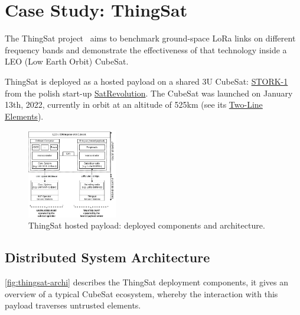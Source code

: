 \section{Case Study: ThingSat}
\label{sec:case-study}

The ThingSat project~\cite{git:thingsat-repo} aims to benchmark ground-space
LoRa links on different frequency bands and demonstrate the
effectiveness of that technology inside a LEO (Low Earth Orbit) CubeSat.

ThingSat is deployed as a hosted payload on a shared 3U CubeSat:
\href{https://space.skyrocket.de/doc_sdat/stork-1.htm}{STORK-1} from the polish
start-up \href{https://www.satrevolution.com/}{SatRevolution}. The CubeSat was
launched on January 13th, 2022, currently in orbit at an altitude of 525km (see its
\href{https://www.n2yo.com/database/?q=STORK-1\#results}{Two-Line Elements}).

\begin{figure}[t]
\centering
    \includegraphics[width=0.35\textwidth]{Figures/globecom-thingsat-mods.jpg}
    \caption{ThingSat hosted payload: deployed components and architecture.}
    \label{fig:thingsat-archi}
\end{figure}

\subsection{Distributed System Architecture}
\label{sec:thingsat-hw}
\autoref{fig:thingsat-archi} describes the ThingSat deployment components, it gives an
overview of a typical CubeSat ecosystem, whereby the interaction with this payload
traverses untrusted elements.


